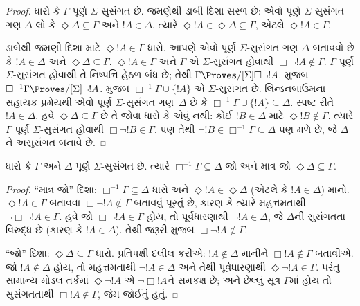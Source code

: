 \documentclass[../../../include/open-logic-section]{subfiles}
\begin{document}
{\begin{proof}
  ધારો કે $\Gamma$ પૂર્ણ $\Sigma$-સુસંગત છે. જમણેથી ડાબી દિશા
  સરળ છે: એવો પૂર્ણ $\Sigma$-સુસંગત ગણ $\Delta$ લો કે
  $\Diamond\Delta \subseteq \Gamma$ અને $!A \in \Delta$.
  ત્યારે $\Diamond!A \in \Diamond\Delta \subseteq \Gamma$,
  એટલે $\Diamond!A \in \Gamma$.

  ડાબેથી જમણી દિશા માટે $\Diamond !A \in \Gamma$ ધારો. આપણે
  એવો પૂર્ણ $\Sigma$-સુસંગત ગણ $\Delta$ બતાવવો છે કે
  $!A \in \Delta$ અને $\Diamond\Delta \subseteq \Gamma$.
  $\Diamond !A \in \Gamma$ અને $\Gamma$ એ $\Sigma$-સુસંગત હોવાથી
  $\Box\lnot !A \notin \Gamma$. $\Gamma$ પૂર્ણ
  $\Sigma$-સુસંગત હોવાથી તે નિષ્પત્તિ હેઠળ બંધ છે; તેથી
  $\Gamma \Proves/[\Sigma] \Box\lnot !A$.
   મુજબ $\Box^{-1}\Gamma \Proves/[\Sigma] \lnot !A$.
  મુજબ $\Box^{-1}\Gamma \cup \{ !A \}$ એ $\Sigma$-સુસંગત છે.
  લિન્ડનબાઉમના સહાયક પ્રમેયથી એવો પૂર્ણ $\Sigma$-સુસંગત
  ગણ~$\Delta$ છે કે $\Box^{-1}\Gamma \cup \{ !A \} \subseteq
  \Delta$. સ્પષ્ટ રીતે $!A \in \Delta$. હવે $\Diamond\Delta
  \subseteq \Gamma$ છે તે જોવા ધારો કે એવું નથી: કોઈ
  $!B \in \Delta$ માટે $\Diamond !B \notin \Gamma$.
  ત્યારે $\Gamma$ પૂર્ણ $\Sigma$-સુસંગત હોવાથી
  $\Box\lnot !B \in \Gamma$. પણ તેથી $\lnot !B \in
  \Box^{-1}\Gamma \subseteq \Delta$ પણ મળે છે, જે $\Delta$ને
  અસુસંગત બનાવે છે.
\end{proof}
}

\begin{lem}
  ધારો કે $\Gamma$ અને $\Delta$ પૂર્ણ $\Sigma$-સુસંગત છે.
  ત્યારે $\Box^{-1}\Gamma \subseteq \Delta$ જો અને માત્ર જો
  $\Diamond\Delta \subseteq \Gamma$.
\end{lem}

\begin{proof}
  ``માત્ર જો'' દિશા: $\Box^{-1}\Gamma \subseteq \Delta$ ધારો અને
  $\Diamond!A \in \Diamond\Delta$ (એટલે કે $!A \in \Delta$)
  માનો. $\Diamond!A \in \Gamma$ બતાવવા $\Box\lnot!A \notin
  \Gamma$ બતાવવું પૂરતું છે, કારણ કે ત્યારે મહત્તમતાથી
  $\lnot\Box\lnot !A \in \Gamma$. હવે જો $\Box\lnot!A \in
  \Gamma$ હોય, તો પૂર્વધારણાથી $\lnot!A \in \Delta$, જે
  $\Delta$ની સુસંગતતા વિરુદ્ધ છે (કારણ કે $!A \in \Delta$).
  તેથી જરૂરી મુજબ $\Box\lnot!A \notin \Gamma$.

  ``જો'' દિશા: $\Diamond\Delta \subseteq \Gamma$ ધારો.
  પ્રતિપક્ષી દલીલ કરીએ: $!A \notin \Delta$ માનીને
  $\Box!A \notin \Gamma$ બતાવીએ. જો $!A \notin \Delta$ હોય,
  તો મહત્તમતાથી $\lnot!A \in \Delta$ અને તેથી પૂર્વધારણાથી
  $\Diamond\lnot!A \in \Gamma$. પરંતુ સામાન્ય મોડલ તર્કમાં
  $\Diamond\lnot!A$ એ $\lnot\Box !A$ને સમકક્ષ છે; અને છેલ્લું
  સૂત્ર $\Gamma$માં હોય તો સુસંગતતાથી $\Box!A \notin\Gamma$,
  જેમ જોઈતું હતું.
\end{proof}
\end{document}
